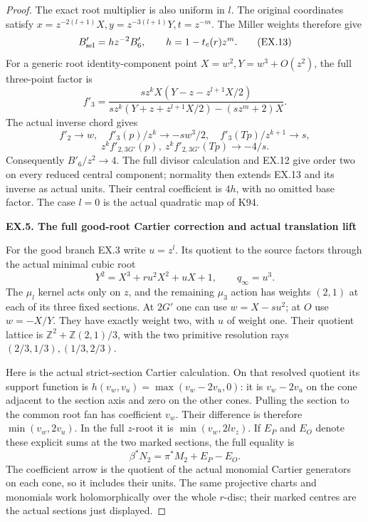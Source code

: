 \begin{proof}
The exact root multiplier is also uniform in \(l\). The original
coordinates satisfy \(x=z^{-2(l+1)}X,y=z^{-3(l+1)}Y,t=z^{-m}\).
The Miller weights therefore give
\[
 B_{\rm sel}'=h z^{-2}B'_6,\qquad h=1-t_c(r)z^m.
 \tag{EX.13}
\]
For a generic root identity-component point \(X=w^2,Y=w^3+O(z^2)\),
the full three-point factor is
\[
 f'_3=\frac{s z^k X(Y-z-z^{l+1}X/2)}
              {s z^k(Y+z+z^{l+1}X/2)-(s z^m+2)X}.
\]
The actual inverse chord gives
\[
 f'_2\to w,\quad f'_3(p)/z^k\to-s w^3/2,\quad
 f'_3(Tp)/z^{k+1}\to s,
\]
\[
 z^k f'_{2,3G'}(p),\ z^k f'_{2,3G'}(Tp)\to-4/s.
\]
Consequently \(B'_6/z^2\to4\). The full divisor calculation
and EX.12 give order two on every reduced central component;
normality then extends EX.13 and its inverse as actual units.
Their central coefficient is \(4h\), with no omitted base
factor. The case \(l=0\) is the actual quadratic map of K94.

\par

\medskip\noindent\textbf{EX.5. The full good-root Cartier correction and actual translation lift}

\par\nobreak

For the good branch EX.3 write \(u=z^l\). Its quotient to the
source factors through the actual minimal cubic root
\[
 Y^2=X^3+r u^2X^2+uX+1,\qquad q_\infty=u^3.
\]
The \(\mu_l\) kernel acts only on \(z\), and the remaining
\(\mu_3\) action has weights \((2,1)\) at each of its three
fixed sections. At \(2G'\) one can use
\(w=X-su^2\); at \(O\) use \(w=-X/Y\). They have exactly
weight two, with \(u\) of weight one. Their quotient lattice is
\(\mathbb Z^2+\mathbb Z(2,1)/3\), with the two primitive
resolution rays \((2/3,1/3),(1/3,2/3)\).

Here is the actual strict-section Cartier calculation. On that
resolved quotient its support function is
\(h(v_w,v_u)=\max(v_w-2v_u,0)\): it is \(v_w-2v_u\)
on the cone adjacent to the section axis and zero on the other
cones. Pulling the section to the common root fan has coefficient
\(v_w\). Their difference is therefore
\(\min(v_w,2v_u)\). In the full \(z\)-root it is
\(\min(v_w,2l v_z)\). If \(E_P\) and \(E_O\) denote
these explicit sums at the two marked sections, the full equality is
\[
          \beta^*N_2=\pi^*M_2+E_P-E_O.
 \tag{EX.14}
\]
The coefficient arrow is the quotient of the actual monomial
Cartier generators on each cone, so it includes their units.
The same projective charts and monomials work holomorphically
over the whole \(r\)-disc; their marked centres are the actual
sections just displayed.


\end{proof}

